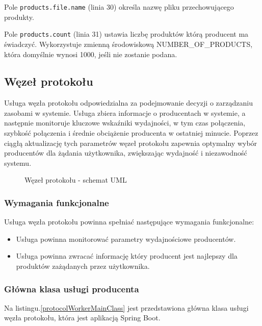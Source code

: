 Pole \verb|products.file.name| (linia 30) określa nazwę pliku przechowującego produkty.

Pole \verb|products.count| (linia 31) ustawia liczbę produktów którą producent ma świadczyć. Wykorzystuje zmienną środowiskową NUMBER\_OF\_PRODUCTS, która domyślnie wynosi 1000, jeśli nie zostanie podana.

\subsection{Węzeł protokołu}

Usługa węzła protokołu odpowiedzialna za podejmowanie decyzji o zarządzaniu zasobami w systemie. Usługa zbiera informacje o producentach w systemie, a następnie monitoruje kluczowe wskaźniki wydajności, w tym czas połączenia, szybkość połączenia i średnie obciążenie producenta w ostatniej minucie. Poprzez ciągłą aktualizację tych parametrów węzeł protokołu zapewnia optymalny wybór producentów dla żądania użytkownika, zwiększając wydajność i niezawodność systemu.

\begin{figure}[!htbp]
    \centering
    
    \caption{Węzeł protokołu - schemat UML}
    \label{WorkerUML}
\end{figure}

\subsubsection{Wymagania funkcjonalne}

Usługa węzła protokołu powinna spełniać następujące wymagania funkcjonalne:

\begin{itemize}
    \item Usługa powinna monitorować parametry wydajnościowe producentów.
    \item Usługa powinna zwracać informację który producent jest najlepszy dla produktów zażądanych przez użytkownika.
\end{itemize}

\subsubsection{Główna klasa usługi producenta}

Na listingu.\ref{protocolWorkerMainClass} jest przedstawiona główna klasa usługi węzła protokołu, która jest aplikacją Spring Boot.

